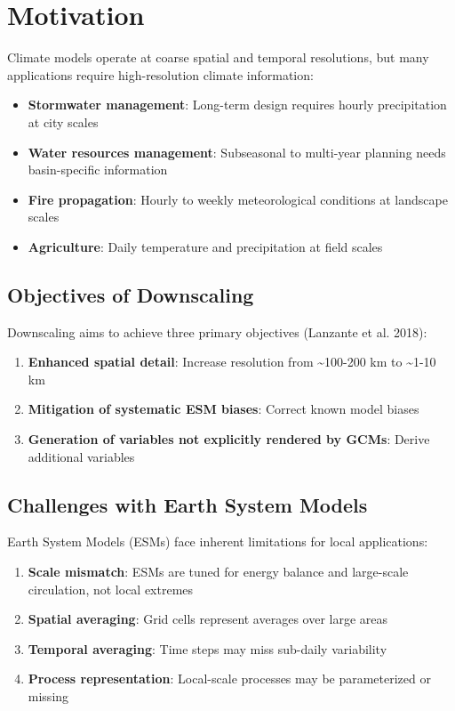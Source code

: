 \documentclass[
  letterpaper,
  DIV=11,
  numbers=noendperiod]{scrreprt}
\providecommand{\tightlist}{%
  \setlength{\itemsep}{0pt}\setlength{\parskip}{0pt}}
\begin{document}
\section{Motivation}\label{motivation}

Climate models operate at coarse spatial and temporal resolutions, but
many applications require high-resolution climate information:

\begin{itemize}
\tightlist
\item
  \textbf{Stormwater management}: Long-term design requires hourly
  precipitation at city scales
\item
  \textbf{Water resources management}: Subseasonal to multi-year
  planning needs basin-specific information
\item
  \textbf{Fire propagation}: Hourly to weekly meteorological conditions
  at landscape scales
\item
  \textbf{Agriculture}: Daily temperature and precipitation at field
  scales
\end{itemize}

\subsection{Objectives of Downscaling}\label{objectives-of-downscaling}

Downscaling aims to achieve three primary objectives (Lanzante et al.
2018):

\begin{enumerate}
\def\labelenumi{\arabic{enumi}.}
\tightlist
\item
  \textbf{Enhanced spatial detail}: Increase resolution from
  \textasciitilde100-200 km to \textasciitilde1-10 km
\item
  \textbf{Mitigation of systematic ESM biases}: Correct known model
  biases
\item
  \textbf{Generation of variables not explicitly rendered by GCMs}:
  Derive additional variables
\end{enumerate}

\subsection{Challenges with Earth System
Models}\label{challenges-with-earth-system-models}

Earth System Models (ESMs) face inherent limitations for local
applications:

\begin{enumerate}
\def\labelenumi{\arabic{enumi}.}
\tightlist
\item
  \textbf{Scale mismatch}: ESMs are tuned for energy balance and
  large-scale circulation, not local extremes
\item
  \textbf{Spatial averaging}: Grid cells represent averages over large
  areas
\item
  \textbf{Temporal averaging}: Time steps may miss sub-daily variability
\item
  \textbf{Process representation}: Local-scale processes may be
  parameterized or missing
\end{enumerate}
\end{document}
